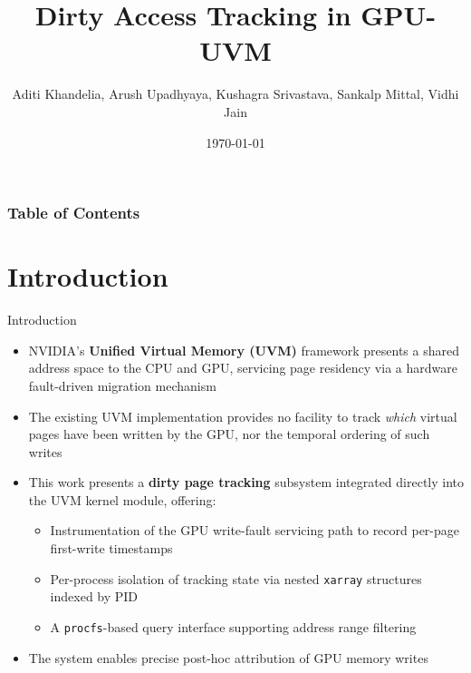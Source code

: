 \documentclass [xcolor=svgnames, t] {beamer}
\title[RUNNING TITLE]{Dirty Access Tracking in GPU-UVM}
\author{\footnotesize Aditi Khandelia, Arush Upadhyaya, Kushagra Srivastava, Sankalp Mittal, Vidhi Jain\vspace{10mm}}
\institute[]{CS614 Course Project  \\Indian Institute of Technology, Kanpur}
\date{\today}
\begin{document}
\begin{frame}
\maketitle
\end{frame}


\begin{frame}
\frametitle{Table of Contents}
\tableofcontents
\end{frame}

\section{Introduction}
\begin{frame}{Introduction}
\begin{itemize}
    \item NVIDIA's \textbf{Unified Virtual Memory (UVM)} framework presents a shared address space to the CPU and GPU, servicing page residency via a hardware fault-driven migration mechanism
    \item The existing UVM implementation provides no facility to track \textit{which} virtual pages have been written by the GPU, nor the temporal ordering of such writes
    \item This work presents a \textbf{dirty page tracking} subsystem integrated directly into the UVM kernel module, offering:
    \begin{itemize}
        \item Instrumentation of the GPU write-fault servicing path to record per-page first-write timestamps
        \item Per-process isolation of tracking state via nested \texttt{xarray} structures indexed by PID
        \item A \texttt{procfs}-based query interface supporting address range filtering
    \end{itemize}
    \item The system enables precise post-hoc attribution of GPU memory writes
\end{itemize}
\end{frame}
\end{document}
